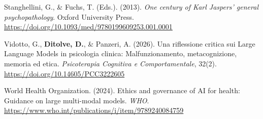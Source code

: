 \documentclass[11pt,a4paper]{article}
\begin{document}
\begin{enumerate}[label={[\arabic*]}]
    \item Stanghellini, G., \& Fuchs, T. (Eds.). (2013). \textit{One century of Karl Jaspers' general psychopathology}. Oxford University Press. \url{https://doi.org/10.1093/med/9780199609253.001.0001}
    \item Vidotto, G., \textbf{Ditolve, D.}, \& Panzeri, A. (2026). Una riflessione critica sui Large Language Models in psicologia clinica: Malfunzionamento, metacognizione, memoria ed etica. \textit{Psicoterapia Cognitiva e Comportamentale}, 32(2). \url{https://doi.org/10.14605/PCC3222605}
    \item World Health Organization. (2024). Ethics and governance of AI for health: Guidance on large multi-modal models. \textit{WHO}. \url{https://www.who.int/publications/i/item/9789240084759}
\end{enumerate}
\end{document}
